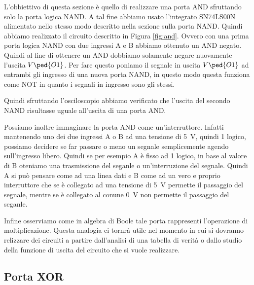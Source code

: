 L'obbiettivo di questa sezione è quello di realizzare una porta AND sfruttando solo la porta logica NAND. A tal fine abbiamo usato l'integrato SN74LS00N alimentato nello stesso modo descritto nella sezione sulla porta NAND.
Quindi abbiamo realizzato il circuito descritto in Figura \ref{fig:and}. Ovvero con una prima porta logica NAND con due ingressi A e B abbiamo ottenuto un AND negato. Quindi al fine di ottenere un AND dobbiamo solamente negare nuovamente l'uscita $V\ped{O1}$. Per fare questo poniamo il segnale in uscita $V\ped{O1}$ ad entrambi gli ingresso di una nuova porta NAND, in questo modo questa funziona come NOT in quanto i segnali in ingresso sono gli stessi.

Quindi sfruttando l'osciloscopio abbiamo verificato che l'uscita del secondo NAND risultasse uguale all'uscita di una porta AND.

Possiamo inoltre immaginare la porta AND come un'interruttore. Infatti mantenendo uno dei due ingressi A o B ad una tensione di \SI{+5}{\volt}, quindi 1 logico, possiamo decidere se far passare o meno un segnale semplicemente agendo sull'ingresso libero.
Quindi se per esempio A è fisso ad 1 logico, in base al valore di B oteniamo una trasmissione del seganle o un'interruzione del segnale. Quindi A si può pensare come ad una linea dati e B come ad un vero e proprio interruttore che se è collegato ad una tensione di \SI{+5}{\volt} permette il passaggio del segnale, mentre se è collegato al conune \SI{0}{\volt} non permette il passaggio del seganle.

Infine osserviamo come in algebra di Boole tale porta rappresenti l'operazione di moltiplicazione. Questa analogia ci tornrà utile nel momento in cui si dovranno relizzare dei circuiti a partire dall'analisi di una tabella di verità o dallo studio della funzione di uscita del circuito che si vuole realizzare.

\subsection*{Porta XOR}

